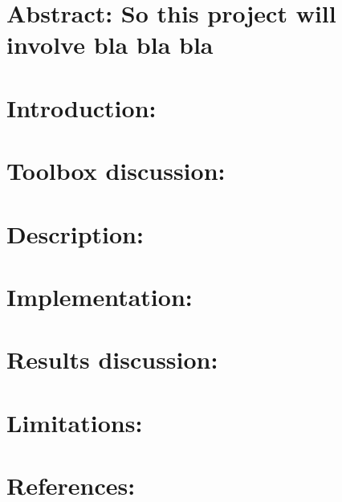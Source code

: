 \documentclass[]{article}
\begin{document}
\hypertarget{abstract-so-this-project-will-involve-bla-bla-bla}{%
\section{Abstract: So this project will involve bla bla
bla}\label{abstract-so-this-project-will-involve-bla-bla-bla}}

\hypertarget{introduction}{%
\section{Introduction:}\label{introduction}}

\hypertarget{toolbox-discussion}{%
\section{Toolbox discussion:}\label{toolbox-discussion}}

\hypertarget{description}{%
\section{Description:}\label{description}}

\hypertarget{implementation}{%
\section{Implementation:}\label{implementation}}

\hypertarget{results-discussion}{%
\section{Results discussion:}\label{results-discussion}}

\hypertarget{limitations}{%
\section{Limitations:}\label{limitations}}

\hypertarget{references}{%
\section{References:}\label{references}}
\end{document}
